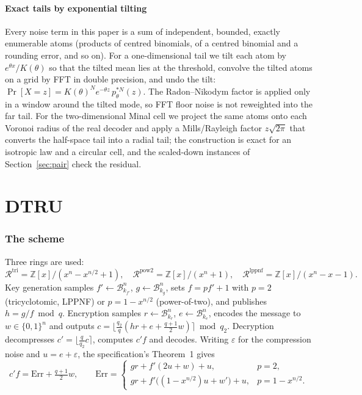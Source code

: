 \documentclass[11pt,a4paper]{article}
\theoremstyle{definition}
\theoremstyle{remark}
\newcommand{\Err}{\mathrm{Err}}
\newcommand{\Z}{\mathbb{Z}}
\newcommand{\R}{\mathcal{R}}
\newcommand{\CBD}{\mathcal{B}}
\begin{document}
\subsection{Exact tails by exponential tilting}
\label{sec:tilt}
Every noise term in this paper is a sum of independent, bounded, exactly
enumerable atoms (products of centred binomials, of a centred binomial and a
rounding error, and so on). For a one-dimensional tail we tilt each atom
by $e^{\theta x}/K(\theta)$ so that the tilted mean lies at the threshold,
convolve the tilted atoms on a grid by FFT in double precision, and undo
the tilt:
$\Pr[X=z]=K(\theta)^N e^{-\theta z}\,p_\theta^{*N}(z)$.
The Radon--Nikodym factor is applied only in a window around the tilted
mode, so FFT floor noise is not reweighted into the far tail. For the
two-dimensional Minal cell we project the same atoms onto each Voronoi
radius of the real decoder and apply a Mills/Rayleigh factor
$z\sqrt{2\pi}$ that converts the half-space tail into a radial tail; the
construction is exact for an isotropic law and a circular cell, and the
scaled-down instances of Section~\ref{sec:pair} check the residual.

\part{DTRU}

\section{The scheme}
\label{sec:dtru}

Three rings are used:
\[
\R^{\mathrm{tri}}=\Z[x]/(x^n-x^{n/2}+1),\quad
\R^{\mathrm{pow2}}=\Z[x]/(x^n+1),\quad
\R^{\mathrm{lppnf}}=\Z[x]/(x^n-x-1).
\]
Key generation samples $f'\leftarrow\CBD_{k_{f'}}^n$, $g\leftarrow\CBD_{k_g}^n$,
sets $f=pf'+1$ with $p=2$ (tricyclotomic, LPPNF) or $p=1-x^{n/2}$
(power-of-two), and publishes $h=g/f\bmod q$. Encryption samples
$r\leftarrow\CBD_{k_r}^n$, $e\leftarrow\CBD_{k_e}^n$, encodes the message to
$w\in\{0,1\}^n$ and outputs
$c=\lfloor \tfrac{q_2}{q}(hr+e+\tfrac{q+1}{2}w)\rceil\bmod q_2$. Decryption
decompresses $c'=\lfloor\tfrac{q}{q_2}c\rceil$, computes $c'f$ and decodes.
Writing $\varepsilon$ for the compression noise and $u=e+\varepsilon$, the
specification's Theorem~1 gives
\begin{equation}
\label{eq:err}
c'f=\Err+\tfrac{q+1}{2}w,\qquad
\Err=\begin{cases}
gr+f'(2u+w)+u, & p=2,\\[2pt]
gr+f'\bigl((1-x^{n/2})u+w'\bigr)+u, & p=1-x^{n/2}.
\end{cases}
\end{equation}
\end{document}
